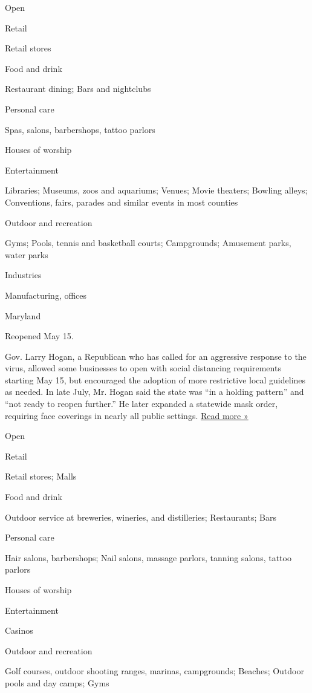 Open

Retail

Retail stores

Food and drink

Restaurant dining; Bars and nightclubs

Personal care

Spas, salons, barbershops, tattoo parlors

Houses of worship

Entertainment

Libraries; Museums, zoos and aquariums; Venues; Movie theaters; Bowling
alleys; Conventions, fairs, parades and similar events in most counties

Outdoor and recreation

Gyms; Pools, tennis and basketball courts; Campgrounds; Amusement parks,
water parks

Industries

Manufacturing, offices

Maryland

Reopened May 15.

Gov. Larry Hogan, a Republican who has called for an aggressive response
to the virus, allowed some businesses to open with social distancing
requirements starting May 15, but encouraged the adoption of more
restrictive local guidelines as needed. In late July, Mr. Hogan said the
state was ``in a holding pattern'' and ``not ready to reopen further.''
He later expanded a statewide mask order, requiring face coverings in
nearly all public settings.
\href{https://www.wbaltv.com/article/coronavirus-maryland-governor-larry-hogan-response-recovery-efforts/33450849}{Read
more »}

Open

Retail

Retail stores; Malls

Food and drink

Outdoor service at breweries, wineries, and distilleries; Restaurants;
Bars

Personal care

Hair salons, barbershops; Nail salons, massage parlors, tanning salons,
tattoo parlors

Houses of worship

Entertainment

Casinos

Outdoor and recreation

Golf courses, outdoor shooting ranges, marinas, campgrounds; Beaches;
Outdoor pools and day camps; Gyms

